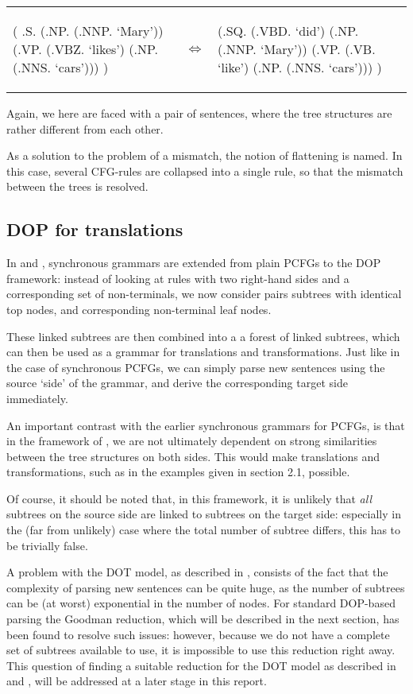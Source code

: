 \documentclass[a4paper]{article}
\theoremstyle{definition}
\begin{document}
\begin{tabular}{lll}
\begin{parsetree}
( .S.
    (.NP. (.NNP. `Mary'))
    (.VP. (.VBZ. `likes')
      (.NP. (.NNS. `cars')))
)
\end{parsetree}
& $\iff$ &
\begin{parsetree}
  (.SQ. (.VBD. `did')
    (.NP. (.NNP. `Mary'))
    (.VP. (.VB. `like')
      (.NP. (.NNS. `cars')))
    )
\end{parsetree}
\end{tabular}

Again, we here are faced with a pair of sentences, where the tree structures are rather different from each other.

As a solution to the problem of a mismatch, the notion of flattening is named. In this case, several CFG-rules are collapsed into a single rule, so that the mismatch between the trees is resolved.

\subsection{DOP for translations}

In \cite{Po} and \cite{Po2}, synchronous grammars are extended from plain PCFGs to the DOP framework: instead of looking at rules with two right-hand sides and a corresponding set of non-terminals, we now consider pairs subtrees with identical top nodes, and corresponding non-terminal leaf nodes.

These linked subtrees are then combined into a a forest of linked subtrees, which can then be used as a grammar for translations and transformations. Just like in the case of synchronous PCFGs, we can simply parse new sentences using the source `side' of the grammar, and derive the corresponding target side immediately.

An important contrast with the earlier synchronous grammars for PCFGs, is that in the framework of \cite{Po}, we are not ultimately dependent on strong similarities between the tree structures on both sides. This would make translations and transformations, such as in the examples given in section 2.1, possible.

Of course, it should be noted that, in this framework, it is unlikely that \emph{all} subtrees on the source side are linked to subtrees on the target side: especially in the (far from unlikely) case where the total number of subtree differs, this has to be trivially false.

A problem with the DOT model, as described in \cite{Po}, consists of the fact that the complexity of parsing new sentences can be quite huge, as the number of subtrees can be (at worst) exponential in the number of nodes. For standard DOP-based parsing the Goodman reduction, which will be described in the next section, has been found to resolve such issues: however, because we do not have a complete set of subtrees available to use, it is impossible to use this reduction right away. This question of finding a suitable reduction for the DOT model as described in \cite{Po} and \cite{Po2}, will be addressed at a later stage in this report.
\end{document}
